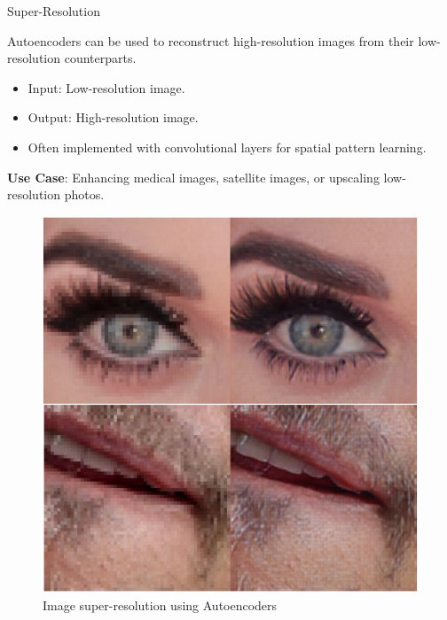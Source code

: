 \begin{frame}[allowframebreaks]{Super-Resolution}

Autoencoders can be used to reconstruct high-resolution images from their low-resolution counterparts.

\begin{itemize}
    \item Input: Low-resolution image.
    \item Output: High-resolution image.
    \item Often implemented with convolutional layers for spatial pattern learning.
\end{itemize}
\textbf{Use Case}: Enhancing medical images, satellite images, or upscaling low-resolution photos.

\framebreak

\begin{figure}
    \centering
    \includegraphics[height=0.8\textheight, width=\textwidth, keepaspectratio]{./images/autoencoders/image_enhancement.png}
    \caption*{Image super-resolution using Autoencoders}
\end{figure}

\end{frame}